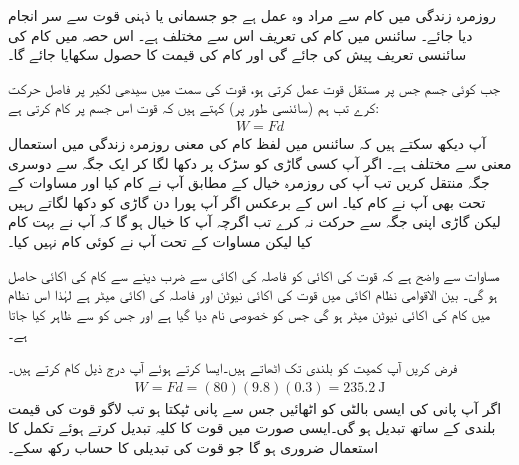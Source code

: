 روزمرہ زندگی میں کام سے مراد وہ عمل ہے جو جسمانی یا ذہنی قوت سے سر انجام دیا جائے۔ سائنس میں کام کی تعریف اس سے مختلف ہے۔ اس حصہ میں کام کی سائنسی  تعریف پیش کی جائے گی اور کام کی قیمت کا حصول سکھایا جائے گا۔

جب کوئی جسم جس پر مستقل قوت  عمل کرتی ہو، قوت کی سمت میں سیدھی لکیر پر فاصل  حرکت کرے تب ہم (سائنسی طور پر) کہتے ہیں کہ قوت  اس جسم پر کام  کرتی ہے:
\begin{align}\label{مساوات_تکمل_استعمال_کام_مستقل_قوت}
W=Fd
\end{align}
آپ دیکھ سکتے ہیں کہ سائنس میں لفظ کام کی معنی روزمرہ زندگی میں استعمال معنی سے مختلف ہے۔ اگر آپ کسی گاڑی کو سڑک پر دکھا لگا کر ایک جگہ سے دوسری جگہ منتقل کریں تب آپ کی روزمرہ خیال کے مطابق آپ نے کام کیا اور مساوات  کے تحت بھی آپ نے کام کیا۔ اس کے برعکس اگر آپ پورا دن گاڑی کو دکھا لگاتے رہیں لیکن گاڑی اپنی جگہ سے حرکت نہ کرے تب اگرچہ آپ کا خیال ہو گا کہ آپ نے بہت کام کیا لیکن مساوات  کے تحت آپ نے کوئی کام نہیں کیا۔

مساوات  سے واضح ہے کہ قوت کی اکائی کو فاصلہ کی اکائی سے ضرب دینے سے کام کی اکائی حاصل ہو گی۔ بین الاقوامی نظام اکائی میں قوت کی اکائی نیوٹن  اور فاصلہ کی اکائی میٹر  ہے لہٰذا اس نظام میں کام کی اکائی نیوٹن میٹر   ہو گی جس کو خصوصی نام  دیا گیا ہے اور جس کو  سے ظاہر کیا جاتا ہے۔

فرض کریں  آپ   کمیت کو  بلندی تک اٹھاتے ہیں۔ایسا کرتے ہوئے آپ درج ذیل کام کرتے ہیں۔
\begin{align*}
W=Fd=(80)(9.8)(0.3)=\SI{235.2}{\joule}
\end{align*}
اگر آپ پانی کی ایسی بالٹی کو اٹھائیں جس سے پانی ٹپکتا ہو تب لاگو قوت کی قیمت بلندی کے ساتھ تبدیل ہو گی۔ایسی صورت میں قوت کا کلیہ  تبدیل کرتے ہوئے تکمل کا استعمال ضروری ہو گا جو قوت  کی تبدیلی کا حساب رکھ سکے۔ 

